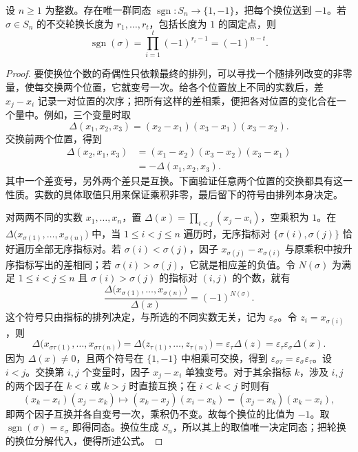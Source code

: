 \begin{theorem}[符号同态]\label{b1:thm:sign}
	设 \(n\geq1\) 为整数。存在唯一群同态 \(\operatorname{sgn}:S_n\rightarrow\{1,-1\}\)，把每个换位送到 \(-1\)。若 \(\sigma\in S_n\) 的不交轮换长度为 \(r_1,\ldots,r_t\)，包括长度为 \(1\) 的固定点，则
	\[
		\operatorname{sgn}(\sigma)=\prod_{i=1}^t(-1)^{r_i-1}=(-1)^{n-t}.
	\]
\end{theorem}
\begin{proof}
	要使换位个数的奇偶性只依赖最终的排列，可以寻找一个随排列改变的非零量，使每交换两个位置，它就变号一次。给各个位置放上不同的实数后，差 \(x_j-x_i\) 记录一对位置的次序；把所有这样的差相乘，便把各对位置的变化合在一个量中。例如，三个变量时取
	\[
		\Delta(x_1,x_2,x_3)=(x_2-x_1)(x_3-x_1)(x_3-x_2).
	\]
	交换前两个位置，得到
	\[
		\begin{aligned}
			\Delta(x_2,x_1,x_3) &=(x_1-x_2)(x_3-x_2)(x_3-x_1)\\
			&=-\Delta(x_1,x_2,x_3).
		\end{aligned}
	\]
	其中一个差变号，另外两个差只是互换。下面验证任意两个位置的交换都具有这一性质。实数的具体取值只用来保证乘积非零，最后留下的符号由排列本身决定。

	对两两不同的实数 \(x_1,\ldots,x_n\)，置 \(\Delta(x)=\prod_{i<j}(x_j-x_i)\)，空乘积为 \(1\)。在 \(\Delta\bigl(x_{\sigma(1)},\ldots,x_{\sigma(n)}\bigr)\) 中，当 \(1\leq i<j\leq n\) 遍历时，无序指标对 \(\{\sigma(i),\sigma(j)\}\) 恰好遍历全部无序指标对。若 \(\sigma(i)<\sigma(j)\)，因子 \(x_{\sigma(j)}-x_{\sigma(i)}\) 与原乘积中按升序指标写出的差相同；若 \(\sigma(i)>\sigma(j)\)，它就是相应差的负值。令 \(N(\sigma)\) 为满足 \(1\leq i<j\leq n\) 且 \(\sigma(i)>\sigma(j)\) 的指标对 \((i,j)\) 的个数，就有
	\[
		\frac{\Delta\bigl(x_{\sigma(1)},\ldots,x_{\sigma(n)}\bigr)}{\Delta(x)} =(-1)^{N(\sigma)}.
	\]
	这个符号只由指标的排列决定，与所选的不同实数无关，记为 \(\varepsilon_\sigma\)。令 \(z_i=x_{\sigma(i)}\)，则
	\[
		\Delta\bigl(x_{\sigma\tau(1)},\ldots,x_{\sigma\tau(n)}\bigr) =\Delta\bigl(z_{\tau(1)},\ldots,z_{\tau(n)}\bigr) =\varepsilon_\tau\Delta(z) =\varepsilon_\tau\varepsilon_\sigma\Delta(x).
	\]
	因为 \(\Delta(x)\ne0\)，且两个符号在 \(\{1,-1\}\) 中相乘可交换，得到 \(\varepsilon_{\sigma\tau}=\varepsilon_\sigma\varepsilon_\tau\)。设 \(i<j\)。交换第 \(i,j\) 个变量时，因子 \(x_j-x_i\) 单独变号。对于其余指标 \(k\)，涉及 \(i,j\) 的两个因子在 \(k<i\) 或 \(k>j\) 时直接互换；在 \(i<k<j\) 时则有
	\[
		(x_k-x_i)(x_j-x_k) \longmapsto (x_k-x_j)(x_i-x_k) =(x_j-x_k)(x_k-x_i),
	\]
	即两个因子互换并各自变号一次，乘积仍不变。故每个换位的比值为 \(-1\)。取 \(\operatorname{sgn}(\sigma)=\varepsilon_\sigma\) 即得同态。换位生成 \(S_n\)，所以其上的取值唯一决定同态；把轮换的换位分解代入，便得所述公式。
\end{proof}

